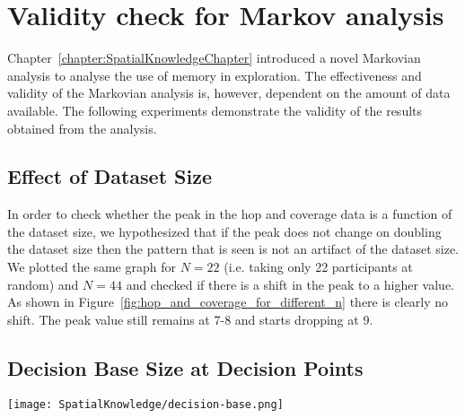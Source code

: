 
\chapter{Validity check for Markov analysis}
\label{sec:validity_check_for_markov_analysis}

Chapter~\ref{chapter:SpatialKnowledgeChapter} introduced a novel Markovian analysis to analyse the use of memory in exploration. The effectiveness and validity of the Markovian analysis is, however, dependent on the amount of data available. The following experiments demonstrate the validity of the results obtained from the analysis.


\section{Effect of Dataset Size} %
\label{sec:effect_of_dataset_size}


In order to check whether the peak in the hop and coverage data is a function of the dataset size, we hypothesized that if the peak does not change on doubling the dataset size then the pattern that is seen is not an artifact of the dataset size. We plotted the same graph for $N=22$ (i.e. taking only 22 participants at random) and $N=44$ and checked if there is a shift in the peak to a higher value. As shown in Figure~\ref{fig:hop_and_coverage_for_different_n} there is clearly no shift. The peak value still remains at 7-8 and starts dropping at 9.

\begin{figure*}[!tb]
  \centering

  \caption[Dataset size dependence of calculations]{Hop and coverage graphs for different size of datasets seems to indicate that the peak is not dependent on data size.}
  \label{fig:hop_and_coverage_for_different_n}
\end{figure*}

\section{Decision Base Size at Decision Points} %
\label{sec:decision_base_size_at_decision_points}

\begin{figure*}[!tb]
    \begin{center}
        \texttt{[image: SpatialKnowledge/decision-base.png]}
    \end{center}
    \caption{Comparison of the decision base sizes.}
    \label{fig:decision_base_comparison}
\end{figure*}

